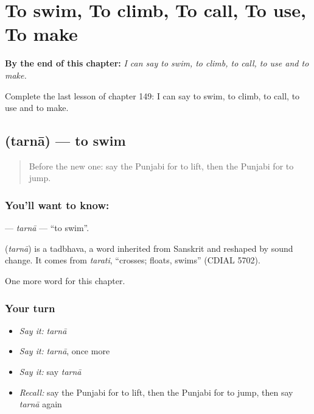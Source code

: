 
\chapter{To swim, To climb, To call, To use, To make}
\label{ch:pa-to-swim-to-climb-to-call-to-use-to-make}

\begin{chapteropening}
\textbf{By the end of this chapter:} \emph{I can say to swim, to climb, to call, to use and to make.}

Complete the last lesson of chapter 149: I can say to swim, to climb, to call, to use and to make.
\end{chapteropening}

\section[\texorpdfstring{\pa{ਤਰਨਾ} (tarnā)}{ਤਰਨਾ (tarnā)}]{ (tarnā) — to swim}

\label{lesson:PA-C149-tarna}



\begin{quote}
Before the new one: say the Punjabi for to lift, then the Punjabi for to jump.
\end{quote}

\subsection*{You'll want to know: }
\textbf{} — \emph{tarnā} — \textquotedblleft{}to swim\textquotedblright{}.

\begin{cousinweb}
\textbf{} (\emph{tarnā}) is a tadbhava, a word inherited from Sanskrit and reshaped by sound change. It comes from \emph{tarati}, \textquotedblleft{}crosses; floats, swims\textquotedblright{} (CDIAL 5702).
\end{cousinweb}

\begin{grammarlens}[title={What you've built}]
One more word for this chapter.
\end{grammarlens}

\subsection*{Your turn}
\begin{itemize}
\raggedright
  \item \emph{Say it:} \emph{tarnā}
  \item \emph{Say it:} \emph{tarnā}, once more
  \item \emph{Say it:} say \emph{tarnā}
  \item \emph{Recall:} say the Punjabi for to lift, then the Punjabi for to jump, then say \emph{tarnā} again
\end{itemize}

